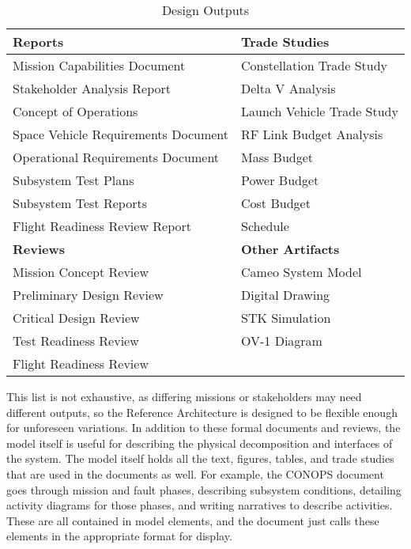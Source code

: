 \begin{table}[H]
\centering
\begin{tabular}{|l|l|}
\hline
\textbf{Reports}                    & \textbf{Trade Studies}     \\
\hline
Mission Capabilities Document       & Constellation Trade Study  \\
Stakeholder Analysis Report         & Delta V Analysis           \\
Concept of Operations               & Launch Vehicle Trade Study \\
Space Vehicle Requirements Document & RF Link Budget Analysis    \\
Operational Requirements Document   & Mass Budget                \\
Subsystem Test Plans                & Power Budget               \\
Subsystem Test Reports              & Cost Budget                \\
Flight Readiness Review Report      & Schedule                   \\
\hline
\textbf{Reviews}                    & \textbf{Other Artifacts} \\
Mission Concept Review              & Cameo System Model \\
Preliminary Design Review           & Digital Drawing \\
Critical Design Review              & STK Simulation \\
Test Readiness Review               & OV-1 Diagram\\
Flight Readiness Review             & \\
\hline
\end{tabular}
\caption{Design Outputs}
\label{table:Design Outputs}
\end{table}

This list is not exhaustive, as differing missions or stakeholders may need different outputs, so the Reference Architecture is designed to be flexible enough for unforeseen variations. In addition to these formal documents and reviews, the model itself is useful for describing the physical decomposition and interfaces of the system. The model itself holds all the text, figures, tables, and trade studies that are used in the documents as well. For example, the CONOPS document goes through mission and fault phases, describing subsystem conditions, detailing activity diagrams for those phases, and writing narratives to describe activities. These are all contained in model elements, and the document just calls these elements in the appropriate format for display. 

